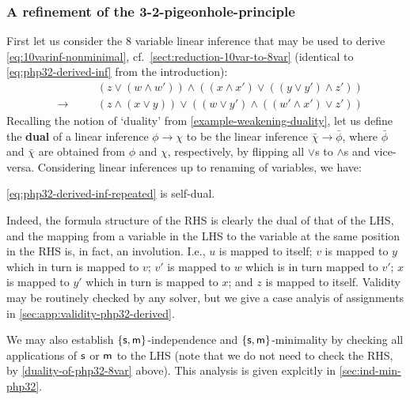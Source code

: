 \documentclass[a4paper, UKenglish, cleveref]{lipics-v2019}
\begin{document}
\subsubsection{A refinement of the 3-2-pigeonhole-principle}
\label{sec:php32-refined}
First let us consider the 8 variable linear inference that may be used to derive \cref{eq:10varinf-nonminimal}, cf.~\cref{sect:reduction-10var-to-8var} (identical to \eqref{eq:php32-derived-inf} from the introduction):%
\begin{equation}
\label{eq:php32-derived-inf-repeated}
\begin{alignedat}{2}
&&& (z \lor (w \land w')) \land ((x \land x') \lor ((y \lor y') \land z')) \\
&\to &\quad& (z \land (x \lor y)) \lor ((w \lor y') \land ((w' \land x') \lor z'))
\end{alignedat}
\end{equation}
Recalling the notion of `duality' from \cref{example-weakening-duality}, let us define the \textbf{dual} of a linear inference $\phi \to \chi$ to be the linear inference $\bar \chi \to \bar \phi$, where $\bar \phi$ and $\bar \chi$ are obtained from $\phi$ and $\chi$, respectively, by flipping all $\lor$s to $\land$s and vice-versa.
Considering linear inferences up to renaming of variables, we have:

\begin{observation}
\label{duality-of-php32-8var}
\eqref{eq:php32-derived-inf-repeated} is self-dual.
\end{observation}
\noindent
Indeed, the formula structure of the RHS is clearly the dual of that of the LHS, and the mapping from a variable in the LHS to the variable at the same position in the RHS is, in fact, an involution. I.e., $u$ is mapped to itself; $v$ is mapped to $y$ which in turn is mapped to $v$; $v'$ is mapped to $w$ which is in turn mapped to $v'$; $x $ is mapped to $y'$ which in turn is mapped to $x$; and $z$ is mapped to itself.
Validity may be routinely checked by any solver, but we give a case analyis of assignments in \cref{sec:app:validity-php32-derived}.

We may also establish $\{\mathsf{s},\mathsf{m} \}$-independence and $\{\mathsf{s},\mathsf{m} \}$-minimality by checking all applications of $\mathsf{s}$ or $\mathsf{m}$ to the LHS (note that we do not need to check the RHS, by \cref{duality-of-php32-8var} above).
This analysis is given explcitly in \cref{sec:ind-min-php32}.
\end{document}
